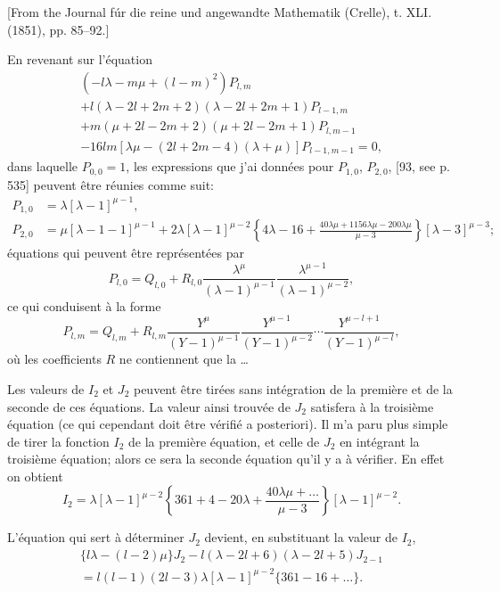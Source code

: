 \documentclass[12pt,a4paper]{article}
\theoremstyle{definition}
\begin{document}
[From the Journal f\'{u}r die reine und angewandte Mathematik (Crelle), t. XLI. (1851), pp. 85--92.]

En revenant sur l'\'{e}quation
\begin{multline*}
(-l\lambda - m\mu + (l - m)^2) P_{l,m} \\
+ l(\lambda - 2l + 2m + 2)(\lambda - 2l + 2m + 1) P_{l-1,m} \\
+ m(\mu + 2l - 2m + 2)(\mu + 2l - 2m + 1) P_{l,m-1} \\
- 16lm[\lambda\mu - (2l + 2m - 4)(\lambda + \mu)] P_{l-1,m-1} = 0,
\end{multline*}
dans laquelle $P_{0,0} = 1$, les expressions que j'ai donn\'{e}es pour $P_{1,0}$, $P_{2,0}$, [93, see p. 535] peuvent \^{e}tre r\'{e}unies comme suit:
\begin{align*}
P_{1,0} &= \lambda[\lambda - 1]^{\mu - 1}, \\
P_{2,0} &= \mu[\lambda - 1 - 1]^{\mu - 1} + 2\lambda[\lambda - 1]^{\mu - 2} \left\{4\lambda - 16 + \frac{40\lambda\mu + 1156\lambda\mu - 200\lambda\mu}{\mu - 3}\right\} [\lambda - 3]^{\mu - 3};
\end{align*}
\'{e}quations qui peuvent \^{e}tre repr\'{e}sent\'{e}es par
\[
P_{l,0} = Q_{l,0} + R_{l,0} \frac{\lambda^{\mu}}{(\lambda - 1)^{\mu - 1}} \frac{\lambda^{\mu - 1}}{(\lambda - 1)^{\mu - 2}},
\]
ce qui conduisent \`{a} la forme
\[
P_{l,m} = Q_{l,m} + R_{l,m} \frac{Y^{\mu}}{(Y - 1)^{\mu - 1}} \frac{Y^{\mu - 1}}{(Y - 1)^{\mu - 2}} \cdots \frac{Y^{\mu - l + 1}}{(Y - 1)^{\mu - l}},
\]
o\`{u} les coefficients $R$ ne contiennent que la \ldots

Les valeurs de $I_2$ et $J_2$ peuvent \^{e}tre tir\'{e}es sans int\'{e}gration de la premi\`{e}re et de la seconde de ces \'{e}quations. La valeur ainsi trouv\'{e}e de $J_2$ satisfera \`{a} la troisi\`{e}me \'{e}quation (ce qui cependant doit \^{e}tre v\'{e}rifi\'{e} a posteriori). Il m'a paru plus simple de tirer la fonction $I_2$ de la premi\`{e}re \'{e}quation, et celle de $J_2$ en int\'{e}grant la troisi\`{e}me \'{e}quation; alors ce sera la seconde \'{e}quation qu'il y a \`{a} v\'{e}rifier. En effet on obtient
\[
I_2 = \lambda[\lambda - 1]^{\mu - 2} \left\{361 + 4 - 20\lambda + \frac{40\lambda\mu + \ldots}{\mu - 3}\right\} [\lambda - 1]^{\mu - 2}.
\]

L'\'{e}quation qui sert \`{a} d\'{e}terminer $J_2$ devient, en substituant la valeur de $I_2$,
\begin{multline*}
\{l\lambda - (l - 2)\mu\} J_2 - l(\lambda - 2l + 6)(\lambda - 2l + 5) J_{2-1} \\
= l(l - 1)(2l - 3)\lambda[\lambda - 1]^{\mu - 2} \{361 - 16 + \ldots\}.
\end{multline*}
\end{document}
